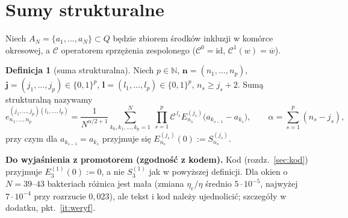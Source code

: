 \documentclass[12pt,a4paper,twoside,openright]{report}
\theoremstyle{definition}
\newtheorem{definicja}{Definicja}[chapter]
\theoremstyle{remark}
\newcommand{\cc}[1]{\overline{#1}}
\newcommand{\czer}[1]{{\color{red}#1}}
\begin{document}
\section{Sumy strukturalne}\label{ssec:struct}

Niech $A_N=\{a_1,\dots,a_N\}\subset Q$ będzie zbiorem środków inkluzji w komórce okresowej, a $\mathcal C$ operatorem sprzężenia zespolonego ($\mathcal C^0=\mathrm{id}$, $\mathcal C^1(w)=\cc w$).

\begin{definicja}[suma strukturalna]\label{def:struct}
Niech $p\in\mathbb N$, $\mathbf n=(n_1,\dots,n_p)$, $\mathbf j=(j_1,\dots,j_p)\in\{0,1\}^p$, $\mathbf l=(l_1,\dots,l_p)\in\{0,1\}^p$, $n_s\ge j_s+2$. Sumą strukturalną nazywamy
\begin{equation}\label{eq:struct}
e^{(j_1,\dots,j_p)(l_1,\dots,l_p)}_{n_1,\dots,n_p}=\frac{1}{N^{\alpha/2+1}}\sum_{k_0,k_1,\dots,k_p=1}^{N}\ \prod_{s=1}^{p}\mathcal C^{\,l_s}E^{(j_s)}_{n_s}\bigl(a_{k_{s-1}}-a_{k_s}\bigr),\qquad \alpha=\sum_{s=1}^p(n_s-j_s),
\end{equation}
przy czym dla $a_{k_{s-1}}=a_{k_s}$ przyjmuje się $E^{(j_s)}_{n_s}(0):=S^{(j_s)}_{n_s}$.
\end{definicja}

\czer{\textbf{Do wyjaśnienia z promotorem (zgodność z kodem).} Kod (rozdz.~\ref{sec:kod}) przyjmuje $E_3^{(1)}(0):=0$, a nie $S_3^{(1)}$ jak w powyższej definicji. Dla okien o $N=39$--$43$ bakteriach różnica jest mała (zmiana $\eta_e/\eta$ średnio $5\cdot10^{-5}$, najwyżej $7\cdot10^{-4}$ przy rozrzucie $0{,}023$), ale tekst i kod należy ujednolicić; szczegóły w dodatku, pkt.~\ref{it:weryf}.}
\end{document}

